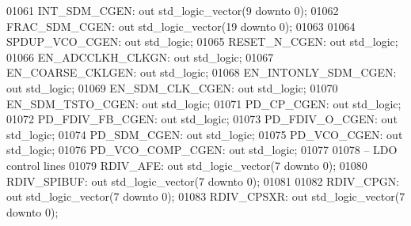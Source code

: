 \begin{DoxyCode}
01061         INT\_SDM\_CGEN:   \textcolor{keywordflow}{out} \textcolor{comment}{std\_logic\_vector}(\textcolor{vhdllogic}{}\textcolor{vhdllogic}{9} \textcolor{keywordflow}{downto} \textcolor{vhdllogic}{}\textcolor{vhdllogic}{0});
01062         FRAC\_SDM\_CGEN:  \textcolor{keywordflow}{out} \textcolor{comment}{std\_logic\_vector}(\textcolor{vhdllogic}{}\textcolor{vhdllogic}{19} \textcolor{keywordflow}{downto} \textcolor{vhdllogic}{}\textcolor{vhdllogic}{0});
01063 
01064         SPDUP\_VCO\_CGEN: \textcolor{keywordflow}{out} \textcolor{comment}{std\_logic};
01065         RESET\_N\_CGEN:   \textcolor{keywordflow}{out} \textcolor{comment}{std\_logic};
01066         EN\_ADCCLKH\_CLKGN:   \textcolor{keywordflow}{out} \textcolor{comment}{std\_logic};
01067         EN\_COARSE\_CKLGEN:   \textcolor{keywordflow}{out} \textcolor{comment}{std\_logic};
01068         EN\_INTONLY\_SDM\_CGEN:    \textcolor{keywordflow}{out} \textcolor{comment}{std\_logic};
01069         EN\_SDM\_CLK\_CGEN:    \textcolor{keywordflow}{out} \textcolor{comment}{std\_logic};
01070         EN\_SDM\_TSTO\_CGEN:   \textcolor{keywordflow}{out} \textcolor{comment}{std\_logic};
01071         PD\_CP\_CGEN:     \textcolor{keywordflow}{out} \textcolor{comment}{std\_logic};
01072         PD\_FDIV\_FB\_CGEN:    \textcolor{keywordflow}{out} \textcolor{comment}{std\_logic};
01073         PD\_FDIV\_O\_CGEN: \textcolor{keywordflow}{out} \textcolor{comment}{std\_logic};
01074         PD\_SDM\_CGEN:    \textcolor{keywordflow}{out} \textcolor{comment}{std\_logic};
01075         PD\_VCO\_CGEN:    \textcolor{keywordflow}{out} \textcolor{comment}{std\_logic};
01076         PD\_VCO\_COMP\_CGEN:   \textcolor{keywordflow}{out} \textcolor{comment}{std\_logic};
01077         
01078 \textcolor{keyword}{        -- LDO control lines    }
01079         RDIV\_AFE:       \textcolor{keywordflow}{out} \textcolor{comment}{std\_logic\_vector}(\textcolor{vhdllogic}{}\textcolor{vhdllogic}{7} \textcolor{keywordflow}{downto} \textcolor{vhdllogic}{}\textcolor{vhdllogic}{0});
01080         RDIV\_SPIBUF:    \textcolor{keywordflow}{out} \textcolor{comment}{std\_logic\_vector}(\textcolor{vhdllogic}{}\textcolor{vhdllogic}{7} \textcolor{keywordflow}{downto} \textcolor{vhdllogic}{}\textcolor{vhdllogic}{0});
01081 
01082         RDIV\_CPGN:  \textcolor{keywordflow}{out} \textcolor{comment}{std\_logic\_vector}(\textcolor{vhdllogic}{}\textcolor{vhdllogic}{7} \textcolor{keywordflow}{downto} \textcolor{vhdllogic}{}\textcolor{vhdllogic}{0});
01083         RDIV\_CPSXR: \textcolor{keywordflow}{out} \textcolor{comment}{std\_logic\_vector}(\textcolor{vhdllogic}{}\textcolor{vhdllogic}{7} \textcolor{keywordflow}{downto} \textcolor{vhdllogic}{}\textcolor{vhdllogic}{0});

\end{DoxyCode}
